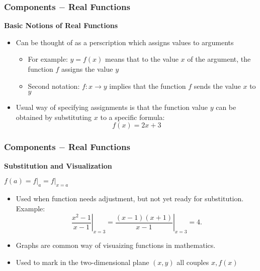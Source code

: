 \documentclass{beamer}
\begin{document}
\begin{frame}[fragile]\frametitle{Components $-$ Real Functions}
\begin{center}\textbf{Basic Notions of Real Functions} \end{center}

\vfill
\begin{itemize}
  \item Can be thought of as a perscription which assigns values to arguments
  \begin{itemize}
    \item For example: $y = f(x)$ means that to the value $x$ of the argument, the function $f$ assigns the value $y$
    \item Second notation: $f:x \to y$ implies that the function $f$ sends the value $x$ to $y$
  \end{itemize}
  \item Usual way of specifying assignments is that the function value $y$ can be obtained by substituting $x$ to a specific formula:
  \begin{equation*}
    f(x) = 2x + 3
  \end{equation*}
  
\end{itemize}

\end{frame}

\begin{frame}[fragile]\frametitle{Components $-$ Real Functions}
\begin{center}\textbf{Substitution and Visualization} \end{center}

\vfill
\begin{center} $f(a) = f \vert_a  =  f \vert_{x=a}$ \end{center}

\vfill
\begin{itemize}
  \item Used when function needs adjustment, but not yet ready for substitution. Example:
  \begin{equation*}
    \left.\frac{x^2 - 1}{x-1}\right\rvert_{x=3} = \left.\frac{(x-1)(x+1)}{x-1}\right\rvert_{x=3} = 4.
  \end{equation*}
  \item Graphs are common way of visuaizing functions in mathematics.
  \item Used to mark in the two-dimensional plane $(x,y)$ all couples $x, f(x)$
  
\end{itemize}

\end{frame}
\end{document}
